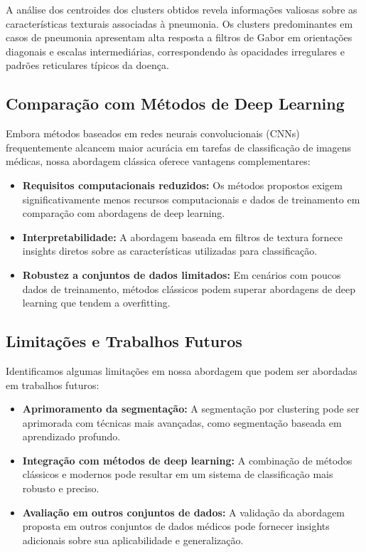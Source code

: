 \documentclass[sigconf,nonacm]{acmart}
\begin{document}
A análise dos centroides dos clusters obtidos revela informações valiosas sobre as características texturais associadas à pneumonia. Os clusters predominantes em casos de pneumonia apresentam alta resposta a filtros de Gabor em orientações diagonais e escalas intermediárias, correspondendo às opacidades irregulares e padrões reticulares típicos da doença.

\subsection{Comparação com Métodos de Deep Learning}

Embora métodos baseados em redes neurais convolucionais (CNNs) frequentemente alcancem maior acurácia em tarefas de classificação de imagens médicas, nossa abordagem clássica oferece vantagens complementares:

\begin{itemize}
  \item \textbf{Requisitos computacionais reduzidos:} Os métodos propostos exigem significativamente menos recursos computacionais e dados de treinamento em comparação com abordagens de deep learning.
  \item \textbf{Interpretabilidade:} A abordagem baseada em filtros de textura fornece insights diretos sobre as características utilizadas para classificação.
  \item \textbf{Robustez a conjuntos de dados limitados:} Em cenários com poucos dados de treinamento, métodos clássicos podem superar abordagens de deep learning que tendem a overfitting.
\end{itemize}

\subsection{Limitações e Trabalhos Futuros}

Identificamos algumas limitações em nossa abordagem que podem ser abordadas em trabalhos futuros:
\begin{itemize}
  \item \textbf{Aprimoramento da segmentação:} A segmentação por clustering pode ser aprimorada com técnicas mais avançadas, como segmentação baseada em aprendizado profundo.
  \item \textbf{Integração com métodos de deep learning:} A combinação de métodos clássicos e modernos pode resultar em um sistema de classificação mais robusto e preciso.
  \item \textbf{Avaliação em outros conjuntos de dados:} A validação da abordagem proposta em outros conjuntos de dados médicos pode fornecer insights adicionais sobre sua aplicabilidade e generalização.
\end{itemize}
\end{document}
